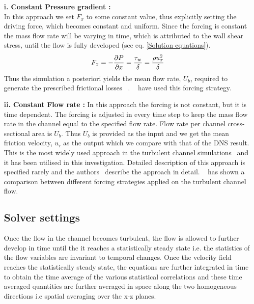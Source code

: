 \textbf{i. Constant Pressure gradient :}\\ In this approach we set $F_x$ to some constant value, thus explicitly setting the driving force, which becomes constant and uniform. 
Since the forcing is constant the mass flow rate will be varying in time, which is attributed to the wall shear stress, until the flow is fully developed (see eq. \ref{Solution equations}).
%
\begin{equation}
\label{CPG}
F_x = -\frac{\partial P}{\partial x} = \frac{\tau_w}{\delta} = \frac{\rho u_\tau^2}{\delta}
\end{equation}
%
Thus the simulation a posteriori yields the mean flow rate, $U_b$, required to generate the prescribed frictional losses ~\cite{Quadrioa:15}. ~\cite{KPremnath:09, Freitas:11} have used this forcing strategy.

\textbf{ii. Constant Flow rate :} In this approach the forcing is not constant, but it is time dependent. The forcing is adjusted in every time step to keep the mass flow rate in the channel equal to the specified flow rate. Flow rate per channel cross-sectional area is $U_b$. Thus $U_b$ is provided as the input and we get the mean friction velocity, $u_\tau$ as the output which we compare with that of the DNS result. This is the most widely used approach in the turbulent channel simulations~\cite{devilliers:phd, sonja:12, roos:book} and it has been utilised in this investigation. Detailed description of this approach is specified rarely and the authors~\cite{Quadrioa:15, Lenormanda:00} describe the approach in detail. ~\cite{Quadrioa:15} has shown a comparison between different forcing strategies applied on the turbulent channel flow.

\subsection{Solver settings} \label{Mach reference}
Once the flow in the channel becomes turbulent, the flow is allowed to further develop in time until the it reaches a statistically steady state i.e. the statistics of the flow variables are invariant to temporal changes. Once the velocity field reaches the statistically steady state, the equations are further integrated in time to obtain the time average of the various statistical correlations and these time averaged quantities are further averaged in space along the two homogeneous directions i.e spatial averaging over the x-z planes. 

